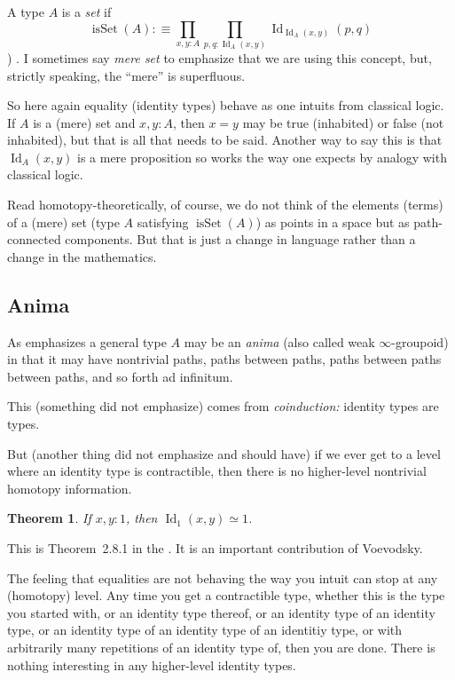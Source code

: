 \documentclass[11pt]{article}
\DeclareMathOperator{\isset}{isSet}
\DeclareMathOperator{\idtype}{Id}
\newtheorem{theorem}{Theorem}
\begin{document}
A type $A$ is a \emph{set} if
\begin{equation} \label{eq:isSet}
  \isset(A) :\equiv \prod_{x, y : A} \prod_{p, q : \idtype_A(x, y)}
  \idtype_{\idtype_A(x, y)}(p, q)
\end{equation}
)
\citep[Section~8.3]{geyer-survey}.
I sometimes say \emph{mere set} to emphasize that
we are using this concept, but, strictly speaking, the ``mere'' is
superfluous.

So here again equality (identity types) behave as one intuits from classical
logic.  If $A$ is a (mere) set and $x, y : A$, then $x = y$ may be true
(inhabited) or false (not inhabited), but that is all that needs to be said.
Another way to say this is that $\idtype_A(x, y)$ is a mere proposition
so works the way one expects by analogy with classical logic.

Read homotopy-theoretically, of course, we do not think of the elements (terms)
of a (mere) set (type $A$ satisfying $\isset(A)$) as points in a space but
as path-connected components.  But that is just a change in language rather
than a change in the mathematics.

\subsection{Anima}

As \citet{geyer-survey} emphasizes a general type $A$ may be an \emph{anima}
(also called weak $\infty$-groupoid) in that it may have nontrivial paths,
paths between paths, paths between paths between paths, and so forth
ad infinitum.

This (something \citet{geyer-survey} did not emphasize) comes from
\emph{coinduction:} identity types are types.

But (another thing \citet{geyer-survey} did not emphasize and should have)
if we ever get to a level where an identity type is contractible, then there
is no higher-level nontrivial homotopy information.
\begin{theorem} \label{th:cut}
If $x, y : 1$, then $\idtype_1(x, y) \simeq 1$.
\end{theorem}
This is Theorem~{2.8.1} in the .
It is an important contribution of Voevodsky.

The feeling that equalities are not behaving the way you intuit can stop
at any (homotopy) level.  Any time you get a contractible type, whether
this is the type you started with, or an identity type thereof, or an
identity type of an identity type, or an identity type of an identity
type of an identitiy type, or with arbitrarily many repetitions of 
an identity type of, then you are done.  There is nothing interesting
in any higher-level identity types.
\end{document}
